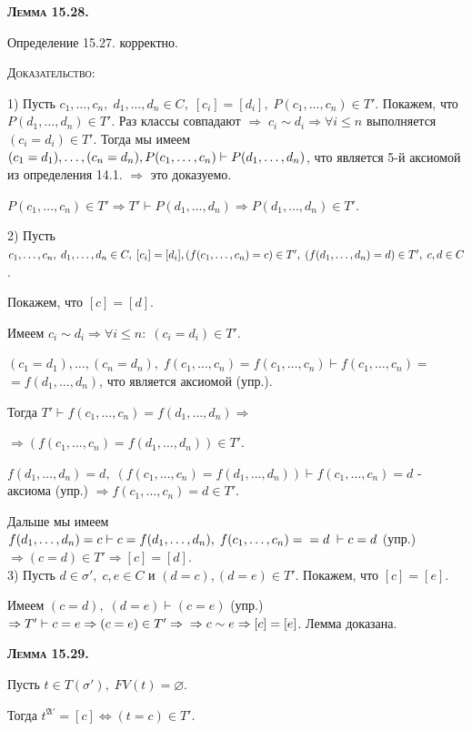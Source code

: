 \documentclass[18pt, a4paper]{extarticle}
\newcommand{\vd}{\vdash}
\newcommand{\mA}{\mathfrak{A}}
\newcommand{\dok}{\textsc{Доказательство:}}
\begin{document}
\textbf{\textsc{Лемма 15.28.}} 

Определение 15.27. корректно.

\dok 

1) Пусть $c_1,\dots,c_n,\;d_1,\dots,d_n\in C,\;[c_i]=[d_i],\;P(c_1,\dots,c_n)\in T'$. Покажем, что $P(d_1,\dots,d_n)\in T'$. Раз классы совпадают $\Rightarrow\;c_i\sim d_i\Rightarrow\forall i\leqslant n $ выполняется $(c_i=d_i)\in T'$. Тогда мы имеем $(c_1=d_1),\dots,(c_n=d_n),\newline P(c_1,\dots,c_n)\vd P(d_1,\dots,d_n)$, что является 5-й аксиомой из определения 14.1. $\Rightarrow$ это доказуемо.

$P(c_1,\dots,c_n)\in T'\Rightarrow T'\vd P(d_1,\dots,d_n)\Rightarrow P(d_1,\dots,d_n)\in T'$.

2) Пусть $c_1,\dots,c_n,\;d_1,\dots,d_n\in C,\;[c_i]=[d_i],\\(f(c_1,\dots,c_n)=c)\in T',\;(f(d_1,\dots,d_n)=d)\in T',\;c,d\in C$. 

Покажем, что $[c]=[d]$. 

Имеем $c_i\sim d_i\Rightarrow\forall i\leqslant n:\;(c_i=d_i)\in T'$.

$(c_1=d_1),\dots,(c_n=d_n),\;f(c_1,\dots,c_n)=f(c_1,\dots,c_n)\vd f(c_1,\dots,c_n)=$\\ $=f(d_1,\dots,d_n)$, что является аксиомой (упр.).

Тогда $T'\vd f(c_1,\dots,c_n)=f(d_1,\dots,d_n)\Rightarrow$

\qquad$\Rightarrow(f(c_1,\dots,c_n)=f(d_1,\dots,d_n))\in T'$.

$f(d_1,\dots,d_n)=d,\;(f(c_1,\dots,c_n)=f(d_1,\dots,d_n))\vd f(c_1,\dots,c_n)=d$ -  аксиома (упр.) $\Rightarrow f(c_1,\dots,c_n)=d\in T'$.

Дальше мы имеем $f(d_1,\dots,d_n)=c\vd c=f(d_1,\dots,d_n),\;f(c_1,\dots,c_n)=\\=d\;\vd c = d$ (упр.) $\Rightarrow(c=d)\in T'\Rightarrow[c]=[d]$.\\

3) Пусть $d\in \sigma',\;c,e\in C$ и $(d=c),(d=e)\in T'$. Покажем, что $[c]=[e]$.

Имеем $(c=d),\;(d=e)\vd(c=e)$ (упр.) $\Rightarrow T'\vd c=e\Rightarrow(c=e)\in T'\Rightarrow\newline\Rightarrow c\sim e\Rightarrow[c]=[e]$. Лемма доказана.

\textbf{\textsc{Лемма 15.29.}} 

Пусть $t\in T(\sigma'),\;FV(t)=\varnothing$. 

Тогда $t^{\mA'}=[c]\Leftrightarrow(t=c)\in T'$.
\end{document}
